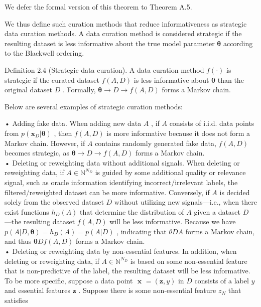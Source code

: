 We defer the formal version of this theorem to Theorem A.5.

We thus define such curation methods that reduce informativeness as
strategic data curation methods. A data curation method is considered
strategic if the resulting dataset is less informative about the true
model parameter \(\pmb \theta\) according to the Blackwell ordering.

Definition 2.4 (Strategic data curation). A data curation method
\(f ( \cdot )\) is strategic if the curated dataset \(f ( A , D )\) is
less informative about \(\pmb \theta\) than the original dataset \(D\) .
Formally, \(\pmb \theta \to D \to f ( A , D )\) forms a Markov chain.

Below are several examples of strategic curation methods:

• Adding fake data. When adding new data \(A\) , if \(A\) consists of
i.i.d. data points from
\(p ( \mathbf { x } _ { D } | \pmb { \theta } )\) , then \(f ( A , D )\)
is more informative because it does not form a Markov chain. However, if
\(A\) contains randomly generated fake data, \(f ( A , D )\) becomes
strategic, as \(\pmb \theta \to D \to f ( A , D )\) forms a Markov
chain.\\
• Deleting or reweighting data without additional signals. When deleting
or reweighting data, if \(A \in \mathbb { N } ^ { N _ { D } }\) is
guided by some additional quality or relevance signal, such as oracle
information identifying incorrect/irrelevant labels, the
filtered/reweighted dataset can be more informative. Conversely, if
\(A\) is decided solely from the observed dataset \(D\) without
utilizing new signals---i.e., when there exist functions
\(h _ { D } ( A )\) that determine the distribution of \(A\) given a
dataset \(D\) ---the resulting dataset \(f ( A , D )\) will be less
informative. Because we have
\(p ( A | D , \pmb \theta ) = h _ { D } ( A ) = p ( A | D )\) ,
indicating that \(\theta  D  A\) forms a Markov chain, and thus
\(\pmb \theta  D  f ( A , D )\) forms a Markov chain.\\
• Deleting or reweighting data by non-essential features. In addition,
when deleting or reweighting data, if
\(A \in \mathbb { N } ^ { N _ { D } }\) is based on some non-essential
feature that is non-predictive of the label, the resulting dataset will
be less informative. To be more specific, suppose a data point
\(\textbf { x } = \left( \mathbf { z } , y \right)\) in \(D\) consists
of a label \(y\) and essential features \(\mathbf { z }\) . Suppose
there is some non-essential feature \(z _ { N }\) that satisfies
